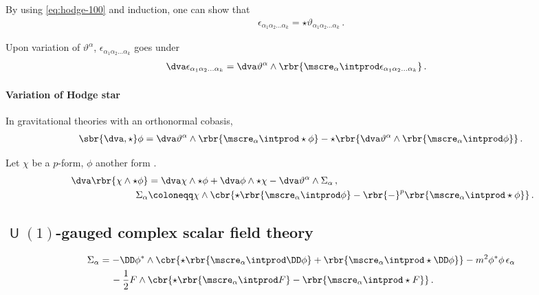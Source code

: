 \documentclass[a4paper]{article}
\begin{document}
By using \cref{eq:hodge-100} and induction, one can show that
\begin{align}
\epsilon_{\alpha_{1}\alpha_{2}\ldots \alpha_{k}} =
\star \vartheta_{\alpha_{1}\alpha_{2}\ldots \alpha_{k}}\,.
\end{align}

Upon variation of $\vartheta^{\alpha}$, $\epsilon_{\alpha_{1}\alpha_{2}\ldots 
\alpha_{k}}$ goes under \cite[sec.\ A.2]{Muench1998}
\begin{align}
\dva \epsilon_{\alpha_{1}\alpha_{2}\ldots \alpha_{k}} &=
\dva \vartheta^{\alpha} \wedge \rbr{\mscre_{\alpha}\intprod 
	\epsilon_{\alpha_{1}\alpha_{2}\ldots \alpha_{k}}}\,.
\end{align}

\paragraph{Variation of Hodge star}
In gravitational theories \cite[sec.\ 3.2]{Muench1998} with an orthonormal 
cobasis,
\begin{align}
\sbr{\dva, \star}\phi = 
\dva\vartheta^{\alpha}\wedge\rbr{\mscre_{\alpha}\intprod\star\phi} -
\star\rbr{\dva\vartheta^{\alpha}\wedge\rbr{\mscre_{\alpha}\intprod\phi}}\,.
\end{align}

Let $\chi$ be a $p$-form, $\phi$ another form \cite[sec.\ 5]{Itin1999}.
\begin{align}\
\dva\rbr{\chi\wedge\star\phi} &=
\dva \chi \wedge \star \phi + \dva \phi \wedge \star \chi -
	\dva \vartheta^{\alpha} \wedge \Sigma_{\alpha}\,,
\\
\Sigma_{\alpha} &\coloneqq \chi \wedge \cbr{
	\star\rbr{\mscre_{\alpha}\intprod\phi} -
	\rbr{-}^{p} \rbr{\mscre_{\alpha}\intprod\star\phi}}\,.
\end{align}

\subsection[$U(1)$-gauged complex scalar field theory]%
{$\msansU(1)$-gauged complex scalar field theory}


\begin{align}
\begin{split}
\Sigma_{\alpha} &=
	-\DD\phi^* \wedge \cbr{\star\rbr{\mscre_{\alpha}\intprod \DD\phi} +
		\rbr{\mscre_{\alpha}\intprod\star\DD\phi}}
-m^2\phi^*\phi\,\epsilon_{\alpha}
\\
&\quad\,
- \frac{1}{2} F \wedge \cbr{\star\rbr{\mscre_{\alpha}\intprod F} -
		\rbr{\mscre_{\alpha}\intprod \star F}}\,.
\end{split}
\end{align}
\end{document}
